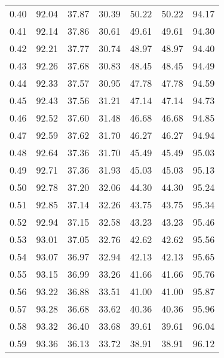 \begin{tabular}{|c|c|c|c|c|c|c|}
      0.40 &     92.04 &     37.87 &      30.39 &   50.22 &      50.22 &         94.17 \\
      0.41 &     92.14 &     37.86 &      30.61 &   49.61 &      49.61 &         94.30 \\
      0.42 &     92.21 &     37.77 &      30.74 &   48.97 &      48.97 &         94.40 \\
      0.43 &     92.26 &     37.68 &      30.83 &   48.45 &      48.45 &         94.49 \\
      0.44 &     92.33 &     37.57 &      30.95 &   47.78 &      47.78 &         94.59 \\
      0.45 &     92.43 &     37.56 &      31.21 &   47.14 &      47.14 &         94.73 \\
      0.46 &     92.52 &     37.60 &      31.48 &   46.68 &      46.68 &         94.85 \\
      0.47 &     92.59 &     37.62 &      31.70 &   46.27 &      46.27 &         94.94 \\
      0.48 &     92.64 &     37.36 &      31.70 &   45.49 &      45.49 &         95.03 \\
      0.49 &     92.71 &     37.36 &      31.93 &   45.03 &      45.03 &         95.13 \\
      0.50 &     92.78 &     37.20 &      32.06 &   44.30 &      44.30 &         95.24 \\
      0.51 &     92.85 &     37.14 &      32.26 &   43.75 &      43.75 &         95.34 \\
      0.52 &     92.94 &     37.15 &      32.58 &   43.23 &      43.23 &         95.46 \\
      0.53 &     93.01 &     37.05 &      32.76 &   42.62 &      42.62 &         95.56 \\
      0.54 &     93.07 &     36.97 &      32.94 &   42.13 &      42.13 &         95.65 \\
      0.55 &     93.15 &     36.99 &      33.26 &   41.66 &      41.66 &         95.76 \\
      0.56 &     93.22 &     36.88 &      33.51 &   41.00 &      41.00 &         95.87 \\
      0.57 &     93.28 &     36.68 &      33.62 &   40.36 &      40.36 &         95.96 \\
      0.58 &     93.32 &     36.40 &      33.68 &   39.61 &      39.61 &         96.04 \\
      0.59 &     93.36 &     36.13 &      33.72 &   38.91 &      38.91 &         96.12 \\

\end{tabular}
